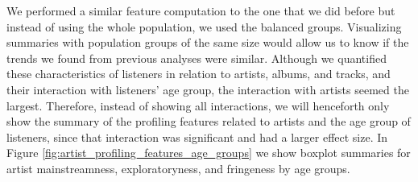 We performed a similar feature computation to the one that we did before but instead of using the whole population, we used the balanced groups. Visualizing summaries with population groups of the same size would allow us to know if the trends we found from previous analyses were similar.  
Although we quantified these characteristics of listeners in relation to artists, albums, and tracks, and their interaction with listeners' age group, the interaction with artists seemed the largest. Therefore, instead of showing all interactions, we will henceforth only show the summary of the profiling features related to artists and the age group of listeners, since that interaction was significant and had a larger effect size.
In Figure \ref{fig:artist_profiling_features_age_groups} we show boxplot summaries for artist mainstreamness, exploratoryness, and fringeness by age groups. 


